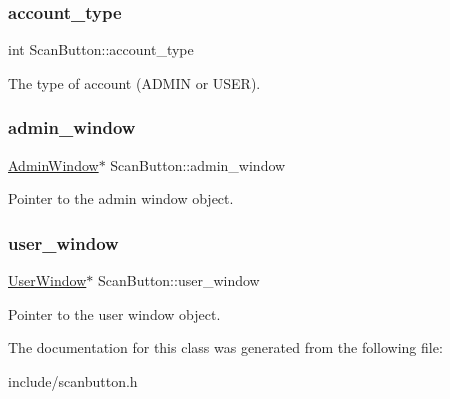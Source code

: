 \subsubsection{\texorpdfstring{account\+\_\+type}{account\_type}}
{\footnotesize\ttfamily int Scan\+Button\+::account\+\_\+type\hspace{0.3cm}{\ttfamily [protected]}}

The type of account (A\+D\+M\+IN or U\+S\+ER). \mbox{\label{classScanButton_a078d1a2a95e8f579fa163c6d903337aa}} 
\subsubsection{\texorpdfstring{admin\+\_\+window}{admin\_window}}
{\footnotesize\ttfamily \hyperlink{classAdminWindow}{Admin\+Window}$\ast$ Scan\+Button\+::admin\+\_\+window\hspace{0.3cm}{\ttfamily [protected]}}

Pointer to the admin window object. \mbox{\label{classScanButton_a5a84fdd77fd4aff624e54914019c711e}} 
\subsubsection{\texorpdfstring{user\+\_\+window}{user\_window}}
{\footnotesize\ttfamily \hyperlink{classUserWindow}{User\+Window}$\ast$ Scan\+Button\+::user\+\_\+window\hspace{0.3cm}{\ttfamily [protected]}}

Pointer to the user window object. 

The documentation for this class was generated from the following file\+:\begin{DoxyCompactItemize}
\item 
include/scanbutton.\+h\end{DoxyCompactItemize}
